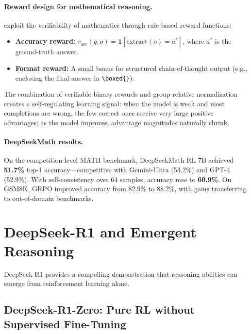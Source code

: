 \documentclass[12pt,a4paper]{report}
\theoremstyle{definition}
\begin{document}
\paragraph{Reward design for mathematical reasoning.}
\cite{shao2024deepseekmath} exploit the verifiability of mathematics through rule-based reward functions:
\begin{itemize}[leftmargin=1.8em,itemsep=2pt]
\item \textbf{Accuracy reward:} $r_{\text{acc}}(q, o) = \mathbf{1}[\text{extract}(o) = a^*]$, where $a^*$ is the ground-truth answer.
\item \textbf{Format reward:} A small bonus for structured chain-of-thought output (e.g., enclosing the final answer in \verb|\boxed{}|).
\end{itemize}

The combination of verifiable binary rewards and group-relative normalization creates a self-regulating learning signal: when the model is weak and most completions are wrong, the few correct ones receive very large positive advantages; as the model improves, advantage magnitudes naturally shrink.

\paragraph{DeepSeekMath results.}
On the competition-level MATH benchmark, DeepSeekMath-RL 7B achieved \textbf{51.7\%} top-1 accuracy---competitive with Gemini-Ultra (53.2\%) and GPT-4 (52.9\%). With self-consistency over 64 samples, accuracy rose to \textbf{60.9\%}. On GSM8K, GRPO improved accuracy from 82.9\% to 88.2\%, with gains transferring to out-of-domain benchmarks.


\section{DeepSeek-R1 and Emergent Reasoning}
\label{sec:deepseek-r1}

DeepSeek-R1 \cite{deepseek2025r1} provides a compelling demonstration that reasoning abilities can emerge from reinforcement learning alone.

\subsection{DeepSeek-R1-Zero: Pure RL without Supervised Fine-Tuning}
\end{document}
